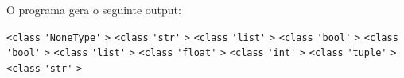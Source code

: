 \documentclass[12pt,varwidth=16cm,border=1pt]{standalone}
\begin{document}
O programa gera o seguinte output:

\verb+<class+ \verb+'NoneType'+ \verb+>+ \newline
\verb+<class+ \verb+'str'+ \verb+>+ \newline
\verb+<class+ \verb+'list'+ \verb+>+ \newline
\verb+<class+ \verb+'bool'+ \verb+>+ \newline
\verb+<class+ \verb+'bool'+ \verb+>+ \newline
\verb+<class+ \verb+'list'+ \verb+>+ \newline
\verb+<class+ \verb+'float'+ \verb+>+ \newline
\verb+<class+ \verb+'int'+ \verb+>+ \newline
\verb+<class+ \verb+'tuple'+ \verb+>+ \newline
\verb+<class+ \verb+'str'+ \verb+>+
\end{document}
